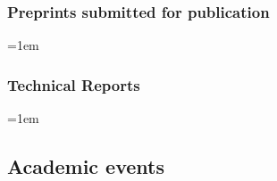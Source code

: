 \documentclass[10pt]{article}
\begin{document}
\subsubsection*{Preprints submitted for publication}

\sloppy
\emergencystretch=1em
\begin{enumerate}[label={[\arabic*]}]
	\item {}
	\item {}
	\item {}
	\item {}
	\item {}
	\item {}
	\item {}
	\item {}
	\item {}
	\item {}
	\item {}
\end{enumerate}

\subsubsection*{Technical Reports}

\sloppy
\emergencystretch=1em
\begin{enumerate}[label={[\arabic*]}]
	\item {}
\end{enumerate}

\subsection{Academic events}
\end{document}
